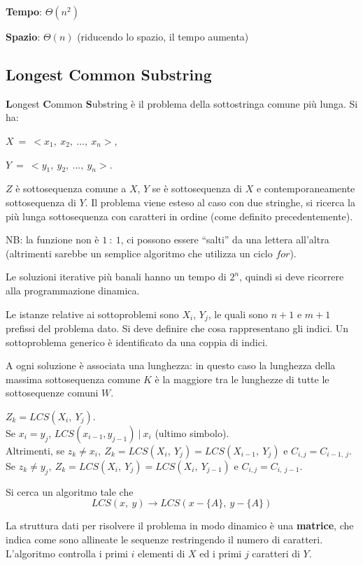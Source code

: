 \textbf{Tempo}: $\Theta(n^2)$

\textbf{Spazio}: $\Theta(n)$ (riducendo lo spazio, il tempo aumenta)

\subsection{Longest Common Substring}
\textbf{L}ongest \textbf{C}ommon \textbf{S}ubstring è il problema della sottostringa comune più lunga. Si ha:

$X\:=\:<x_1,\:x_2,\:\dots,\:x_n>$,

$Y\:=\:<y_1,\:y_2,\:\dots,\:y_n>$.

$Z$ è sottosequenza comune a $X$, $Y$ se è sottosequenza di $X$ e contemporaneamente sottosequenza di $Y$. Il problema viene esteso al caso con due stringhe, si ricerca la più lunga sottosequenza con caratteri in ordine (come definito precedentemente).

NB: la funzione non è $1\ :\ 1$,  ci possono essere ``salti'' da una lettera all'altra (altrimenti sarebbe un semplice algoritmo che utilizza un ciclo $for$).

Le soluzioni iterative più banali hanno un tempo di $2^n$, quindi si deve ricorrere alla programmazione dinamica.

Le istanze relative ai sottoproblemi sono $X_i$, $Y_j$, le quali sono $n + 1$ e $m + 1$ prefissi del problema dato. Si deve definire che cosa rappresentano gli indici. Un sottoproblema generico è identificato da una coppia di indici. 

A ogni soluzione è associata una lunghezza: in questo caso la lunghezza della massima sottosequenza comune $K$ è la maggiore tra le lunghezze di tutte le sottosequenze comuni $W$. 

$Z_k = LCS(X_i,\ Y_j)$. \\
Se $x_i = y_j$, $LCS(x_{i-1}, y_{j-1})\ |\ x_i$ (ultimo simbolo). \\
Altrimenti, se $z_k \neq x_i,\ Z_k = LCS(X_i,\ Y_j) = LCS(X_{i-1},\ Y_j)$ e $C_{i, j} = C_{i-1,\ j}$.
Se $z_k \neq y_j,\ Z_k = LCS(X_i,\ Y_j) = LCS(X_i,\ Y_{j-1})$ e $C_{i, j} = C_{i,\ j-1}$.

Si cerca un algoritmo tale che
$$LCS(x,\ y) \rightarrow LCS(x-\{A\},\ y-\{A\})$$

La struttura dati per risolvere il problema in modo dinamico è una \textbf{matrice}, che indica come sono allineate le sequenze restringendo il numero di caratteri. L'algoritmo controlla i primi $i$ elementi di $X$ ed i primi $j$ caratteri di $Y$.

